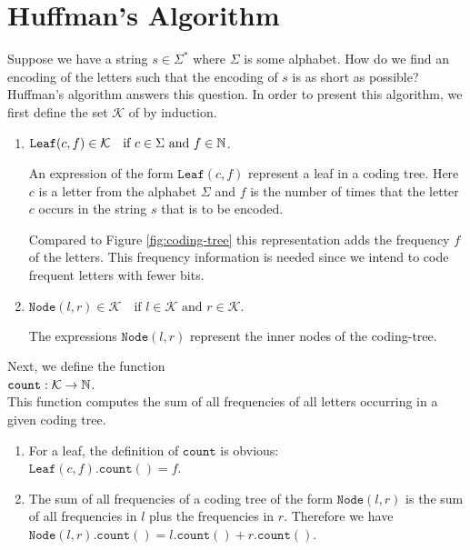 \section{Huffman's Algorithm}
Suppose we have a string $s \in \Sigma^*$ where $\Sigma$ is some alphabet.  How do we find an encoding of the letters such 
that the encoding of $s$ is as short as possible?  Huffman's algorithm answers this question.  In order 
to present this algorithm, we first define the set $\mathcal{K}$ of  by induction.
\begin{enumerate}
\item $\mathtt{Leaf}(c,f) \in \mathcal{K} \quad \mbox{if $c \in \Sigma$ and $f \in {\mathbb N}$}$.

      An expression of the form $\mathtt{Leaf}(c,f)$ represent a leaf in a coding tree.  Here  $c$ is a letter
      from the alphabet $\Sigma$ and $f$ is the number of times that the letter $c$ occurs in the string $s$
      that is to be encoded.

      Compared to Figure \ref{fig:coding-tree} this representation adds the frequency $f$ of the letters.
      This frequency information is needed since we intend to code frequent letters with fewer bits.
\item $\mathtt{Node}(l,r) \in \mathcal{K} \quad \mbox{if $l \in\mathcal{K}$ and $r \in \mathcal{K}$.}$ 

      The expressions $\mathtt{Node}(l,r)$ represent the inner nodes of the coding-tree.
\end{enumerate}
Next, we define the function
\\[0.2cm]
\hspace*{1.3cm}
$\mathtt{count} : \mathcal{K} \rightarrow {\mathbb N}$.
\\[0.2cm] 
This function computes the sum of all frequencies of all letters occurring in a given coding tree.
\begin{enumerate}
\item For a leaf, the definition of $\mathtt{count}$ is obvious:
      \\[0.2cm]
      \hspace*{1.3cm}
      $\mathtt{Leaf}(c,f).\mathtt{count}() = f$.
\item The sum of all frequencies of a coding tree of the form $\mathtt{Node}(l,r)$ is the sum of all frequencies
      in $l$ plus the frequencies in $r$.  Therefore we have
      \\[0.2cm]
      \hspace*{1.3cm}
      $\mathtt{Node}(l,r).\mathtt{count}() = l.\mathtt{count}() + r.\mathtt{count}()$. 
\end{enumerate}
